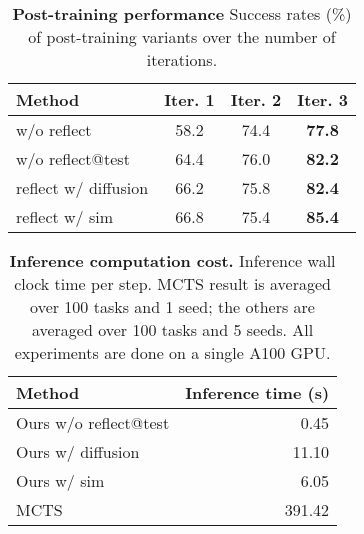 \begin{table}[t]
    \centering
        \centering
        \caption{{\textbf{Post-training performance} Success rates (\%) of post-training variants over the number of iterations.}}
        \label{tab:dagger_results}
        \begin{tabular}{l|ccc}
        \toprule Method             &  Iter. 1  & Iter. 2  & Iter. 3  \\
        \midrule
            w/o reflect	            &58.2    & 74.4 & \textbf{77.8}  \\
            w/o reflect@test	    &64.4    & 76.0 & \textbf{82.2} 	\\
            reflect w/ diffusion	&66.2    & 75.8 & \textbf{82.4} \\
            reflect w/ sim          &66.8   & 75.4 & \textbf{85.4} \\
        \bottomrule
        \end{tabular}%
\end{table}
\begin{table}[t!]
    \centering
        \centering
        \caption{\textbf{Inference computation cost.} Inference wall clock time per step. MCTS result is averaged over 100 tasks and 1 seed; the others are averaged over 100 tasks and 5 seeds. All experiments are done on a single A100 GPU.}
        \label{tab:inference_cost}

        \begin{tabular}{l|r}
        \toprule Method &  Inference time (s) \\
        \midrule
            Ours w/o reflect@test & 0.45  \\
            Ours w/ diffusion	& 11.10 	\\
            Ours w/ sim & 6.05 \\
            MCTS & 391.42 \\
        \bottomrule
        \end{tabular}%
\end{table}

